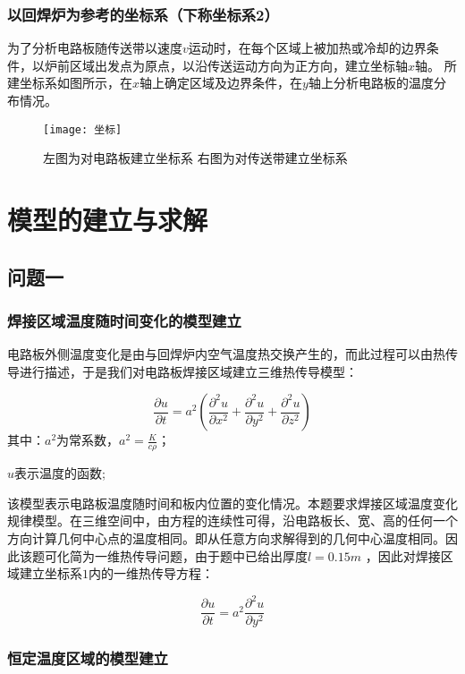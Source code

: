 \documentclass[withoutpreface,bwprint]{cumcmthesis} %
\numberwithin{equation}{subsection}
\begin{document}
\subsubsection{以回焊炉为参考的坐标系（下称坐标系2）}
为了分析电路板随传送带以速度$v$运动时，在每个区域上被加热或冷却的边界条件，以炉前区域出发点为原点，以沿传送运动方向为正方向，建立坐标轴$x$轴。
所建坐标系如图所示，在$𝑥$轴上确定区域及边界条件，在$y$轴上分析电路板的温度分布情况。



\begin{figure}[!h]
	\centering
	\texttt{[image: 坐标]}
	\caption{左图为对电路板建立坐标系 \quad   右图为对传送带建立坐标系}
	\label{fig:x_y}
\end{figure}

\section{模型的建立与求解}

\subsection{问题一}

\subsubsection{焊接区域温度随时间变化的模型建立}
电路板外侧温度变化是由与回焊炉内空气温度热交换产生的，而此过程可以由热传导进行描述，于是我们对电路板焊接区域建立三维热传导模型\cite{yangshimin2006}：

$$
\frac{\partial u}{\partial t}=a^{2}\left(\frac{\partial^{2} u}{\partial x^{2}}+\frac{\partial^{2} u}{\partial y^{2}}+\frac{\partial^{2} u}{\partial z^{2}}\right)
$$
其中：$a^2$为常系数，$a^2= \frac{K}{c\rho}$；

$u$表示温度的函数;

该模型表示电路板温度随时间和板内位置的变化情况。本题要求焊接区域温度变化规律模型。在三维空间中，由方程的连续性可得，沿电路板长、宽、高的任何一个方向计算几何中心点的温度相同。即从任意方向求解得到的几何中心温度相同。因此该题可化简为一维热传导问题，由于题中已给出厚度$𝑙=0.15𝑚$ ，因此对焊接区域建立坐标系$1$内的一维热传导方程\cite{yangshimin2006}：

\begin{equation}
	\frac{\partial u}{\partial t}=a^{2} \frac{\partial^{2} u}{\partial y^{2}}
	\label{6.0}
\end{equation}
\subsubsection{恒定温度区域的模型建立}
\end{document}
